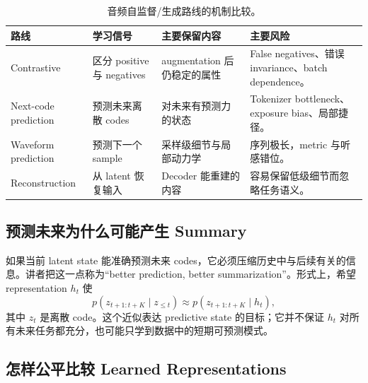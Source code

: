 \begin{table}[H]
\centering
\small
\caption{音频自监督/生成路线的机制比较。}
\begin{tabularx}{\textwidth}{L{0.20\textwidth}L{0.22\textwidth}L{0.24\textwidth}X}
\toprule
路线 & 学习信号 & 主要保留内容 & 主要风险 \\
\midrule
Contrastive & 区分 positive 与 negatives & augmentation 后仍稳定的属性 & False negatives、错误 invariance、batch dependence。 \\
Next-code prediction & 预测未来离散 codes & 对未来有预测力的状态 & Tokenizer bottleneck、exposure bias、局部捷径。 \\
Waveform prediction & 预测下一个 sample & 采样级细节与局部动力学 & 序列极长，metric 与听感错位。 \\
Reconstruction & 从 latent 恢复输入 & Decoder 能重建的内容 & 容易保留低级细节而忽略任务语义。 \\
\bottomrule
\end{tabularx}
\end{table}


\subsection{预测未来为什么可能产生 Summary}

如果当前 latent state 能准确预测未来 codes，它必须压缩历史中与后续有关的信息。讲者把这一点称为“better prediction, better summarization”。形式上，希望 representation $h_t$ 使
\[
p(z_{t+1:t+K}\mid z_{\le t})
\approx p(z_{t+1:t+K}\mid h_t),
\]
其中 $z_t$ 是离散 code。这个近似表达 predictive state 的目标；它并不保证 $h_t$ 对所有未来任务都充分，也可能只学到数据中的短期可预测模式。



\subsection{怎样公平比较 Learned Representations}


